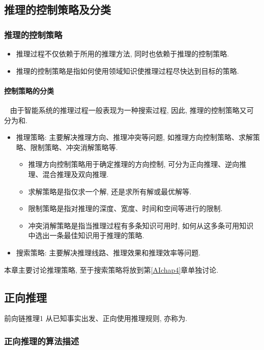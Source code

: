 \subsection{推理的控制策略及分类}
\subsubsection{推理的控制策略}
\begin{itemize}
\item 推理过程不仅依赖于所用的推理方法, 同时也依赖于推理的控制策略.
\item 推理的控制策略是指如何使用领域知识使推理过程尽快达到目标的策略.
\end{itemize}
\paragraph{控制策略的分类}~{}
由于智能系统的推理过程一般表现为一种搜索过程, 因此, 推理的控制策略又可分为和.
\begin{itemize}
\item 推理策略: 主要解决推理方向、推理冲突等问题, 如推理方向控制策略、求解策略、限制策略、冲突消解策略等.
    \begin{itemize}
    \item 推理方向控制策略用于确定推理的方向控制, 可分为正向推理、逆向推理、混合推理及双向推理.
    \item 求解策略是指仅求一个解, 还是求所有解或最优解等.
    \item 限制策略是指对推理的深度、宽度、时间和空间等进行的限制.
    \item 冲突消解策略是指当推理过程有多条知识可用时, 如何从这多条可用知识中选出一条最佳知识用于推理的策略.
    \end{itemize}
\item 搜索策略: 主要解决推理线路、推理效果和推理效率等问题.
\end{itemize}
本章主要讨论推理策略, 至于搜索策略将放到第\ref{AIchap4}章单独讨论.
\subsection{正向推理}
\begin{mydef}{前向链推理}{1}
从已知事实出发、正向使用推理规则, 亦称为.
\end{mydef}
\subsubsection{正向推理的算法描述}

